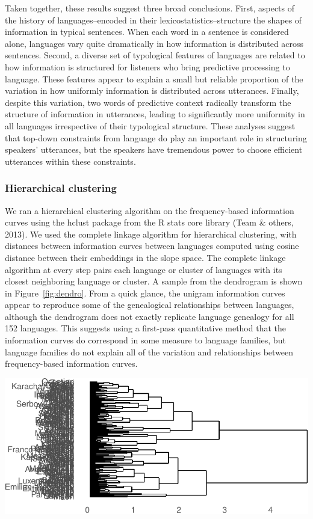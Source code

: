 \documentclass[
  english,
  man,floatsintext]{apa6}
\begin{document}
Taken together, these results suggest three broad conclusions. First, aspects of the history of languages--encoded in their lexicostatistics--structure the shapes of information in typical sentences. When each word in a sentence is considered alone, languages vary quite dramatically in how information is distributed across sentences. Second, a diverse set of typological features of languages are related to how information is structured for listeners who bring predictive processing to language. These features appear to explain a small but reliable proportion of the variation in how uniformly information is distributed across utterances. Finally, despite this variation, two words of predictive context radically transform the structure of information in utterances, leading to significantly more uniformity in all languages irrespective of their typological structure. These analyses suggest that top-down constraints from language do play an important role in structuring speakers' utterances, but the speakers have tremendous power to choose efficient utterances within these constraints.

\hypertarget{hierarchical-clustering}{%
\subsubsection{Hierarchical clustering}\label{hierarchical-clustering}}

We ran a hierarchical clustering algorithm on the frequency-based information curves using the hclust package from the R stats core library (Team \& others, 2013). We used the complete linkage algorithm for hierarchical clustering, with distances between information curves between languages computed using cosine distance between their embeddings in the slope space. The complete linkage algorithm at every step pairs each language or cluster of languages with its closest neighboring language or cluster. A sample from the dendrogram is shown in Figure~\ref{fig:dendro}. From a quick glance, the unigram information curves appear to reproduce some of the genealogical relationships between languages, although the dendrogram does not exactly replicate language genealogy for all 152 languages. This suggests using a first-pass quantitative method that the information curves do correspond in some measure to language families, but language families do not explain all of the variation and relationships between frequency-based information curves.

\includegraphics{figs/dendro-1.pdf}
\end{document}
